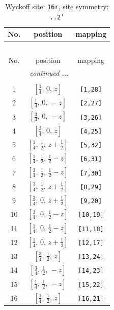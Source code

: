 \documentclass[fleqn,8pt]{jsarticle}
\begin{document}
\renewcommand{\arraystretch}{1.2}
\begin{longtable}{ccc}
\caption{Wyckoff site: {\tt 16r}, site symmetry: {\tt ..2'}}
 \\
 \hline \hline
No. & position & mapping \\ \hline \endfirsthead

\multicolumn{2}{l}{\tablename\ \thetable{}} \\
 \hline \hline
No. & position & mapping \\ \hline \endhead

 \hline \hline
\multicolumn{2}{r}{\footnotesize\it continued ...} \\ \endfoot

 \hline \hline
\multicolumn{2}{r}{} \\ \endlastfoot

1 & $\left[ \frac{1}{4},\, 0,\, z \right]$ & {\tt [1,28]} \\ \hline
2 & $\left[ \frac{1}{4},\, 0,\, - z \right]$ & {\tt [2,27]} \\ \hline
3 & $\left[ \frac{3}{4},\, 0,\, - z \right]$ & {\tt [3,26]} \\ \hline
4 & $\left[ \frac{3}{4},\, 0,\, z \right]$ & {\tt [4,25]} \\ \hline
5 & $\left[ \frac{1}{4},\, \frac{1}{2},\, z + \frac{1}{2} \right]$ & {\tt [5,32]} \\ \hline
6 & $\left[ \frac{1}{4},\, \frac{1}{2},\, \frac{1}{2} - z \right]$ & {\tt [6,31]} \\ \hline
7 & $\left[ \frac{3}{4},\, \frac{1}{2},\, \frac{1}{2} - z \right]$ & {\tt [7,30]} \\ \hline
8 & $\left[ \frac{3}{4},\, \frac{1}{2},\, z + \frac{1}{2} \right]$ & {\tt [8,29]} \\ \hline
9 & $\left[ \frac{3}{4},\, 0,\, z + \frac{1}{2} \right]$ & {\tt [9,20]} \\ \hline
10 & $\left[ \frac{3}{4},\, 0,\, \frac{1}{2} - z \right]$ & {\tt [10,19]} \\ \hline
11 & $\left[ \frac{1}{4},\, 0,\, \frac{1}{2} - z \right]$ & {\tt [11,18]} \\ \hline
12 & $\left[ \frac{1}{4},\, 0,\, z + \frac{1}{2} \right]$ & {\tt [12,17]} \\ \hline
13 & $\left[ \frac{3}{4},\, \frac{1}{2},\, z \right]$ & {\tt [13,24]} \\ \hline
14 & $\left[ \frac{3}{4},\, \frac{1}{2},\, - z \right]$ & {\tt [14,23]} \\ \hline
15 & $\left[ \frac{1}{4},\, \frac{1}{2},\, - z \right]$ & {\tt [15,22]} \\ \hline
16 & $\left[ \frac{1}{4},\, \frac{1}{2},\, z \right]$ & {\tt [16,21]} \\
\end{longtable}
\end{document}
